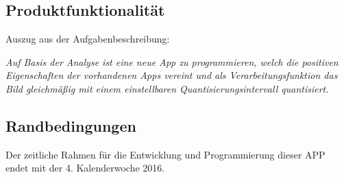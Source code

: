\subsection{\textbf{Produktfunktionalität}}

Auszug aus der Aufgabenbeschreibung:

\textit{\glqq
Auf Basis der Analyse ist eine neue App zu programmieren,
welch die positiven Eigenschaften der vorhandenen Apps vereint und als Verarbeitungsfunktion
das Bild gleichmäßig mit einem einstellbaren Quantisierungsintervall quantisiert.\grqq
} 

\subsection{\textbf{Randbedingungen}}

Der zeitliche Rahmen für die Entwicklung und Programmierung dieser APP endet mit der 4. Kalenderwoche 2016.

%

%

%
%

